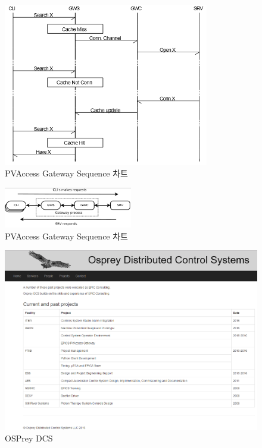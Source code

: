 \documentclass[11pt
  , a4paper
  , article
  , oneside
]{memoir}
\begin{document}
\begin{figure}[!htb]
	\centering
	\includegraphics[width=0.8\textwidth, height=0.6\textheight]{./images/cached.png}
	\caption{
		PVAccess Gateway Sequence 차트
	}
	\label{fig:cached}   
\end{figure}

\begin{figure}[!htb]
	\centering
	\includegraphics[width=0.5\textwidth, height=0.2\textheight]{./images/connections.png}
	\caption{
		PVAccess Gateway Sequence 차트
	}
	\label{fig:connections}   
\end{figure}

\begin{figure}[!htb]
	\centering
	\includegraphics[width=1\textwidth, height=0.6\textheight]{./images/osprey_dcs.png}
	\caption{
		OSPrey DCS
	}
	\label{fig:osprey}   
\end{figure}
\end{document}
